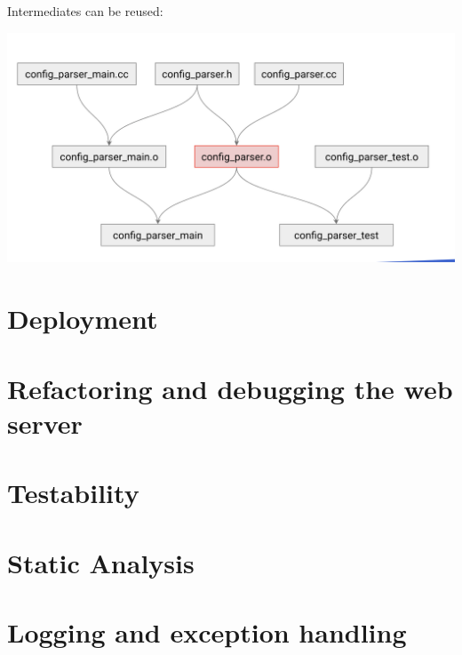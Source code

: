 \documentclass{article}
\begin{document}
Intermediates can be reused:
\begin{center}
    \includegraphics*[width=0.7\linewidth]{reusingIntermediates.png}
\end{center}

\pagebreak

\section{Deployment}

\pagebreak

\section{Refactoring and debugging the web server}

\pagebreak

\section{Testability}

\pagebreak

\section{Static Analysis}

\pagebreak

\section{Logging and exception handling}

\pagebreak
\end{document}
